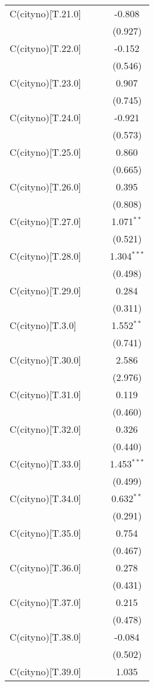 \begin{table}[!htbp]
\begin{tabular}{@{\extracolsep{5pt}}lccc}
 C(cityno)[T.21.0] & & & -0.808$^{}$ \\
& & & (0.927) \\
 C(cityno)[T.22.0] & & & -0.152$^{}$ \\
& & & (0.546) \\
 C(cityno)[T.23.0] & & & 0.907$^{}$ \\
& & & (0.745) \\
 C(cityno)[T.24.0] & & & -0.921$^{}$ \\
& & & (0.573) \\
 C(cityno)[T.25.0] & & & 0.860$^{}$ \\
& & & (0.665) \\
 C(cityno)[T.26.0] & & & 0.395$^{}$ \\
& & & (0.808) \\
 C(cityno)[T.27.0] & & & 1.071$^{**}$ \\
& & & (0.521) \\
 C(cityno)[T.28.0] & & & 1.304$^{***}$ \\
& & & (0.498) \\
 C(cityno)[T.29.0] & & & 0.284$^{}$ \\
& & & (0.311) \\
 C(cityno)[T.3.0] & & & 1.552$^{**}$ \\
& & & (0.741) \\
 C(cityno)[T.30.0] & & & 2.586$^{}$ \\
& & & (2.976) \\
 C(cityno)[T.31.0] & & & 0.119$^{}$ \\
& & & (0.460) \\
 C(cityno)[T.32.0] & & & 0.326$^{}$ \\
& & & (0.440) \\
 C(cityno)[T.33.0] & & & 1.453$^{***}$ \\
& & & (0.499) \\
 C(cityno)[T.34.0] & & & 0.632$^{**}$ \\
& & & (0.291) \\
 C(cityno)[T.35.0] & & & 0.754$^{}$ \\
& & & (0.467) \\
 C(cityno)[T.36.0] & & & 0.278$^{}$ \\
& & & (0.431) \\
 C(cityno)[T.37.0] & & & 0.215$^{}$ \\
& & & (0.478) \\
 C(cityno)[T.38.0] & & & -0.084$^{}$ \\
& & & (0.502) \\
 C(cityno)[T.39.0] & & & 1.035$^{}$ \\

\end{tabular}
\end{table}
